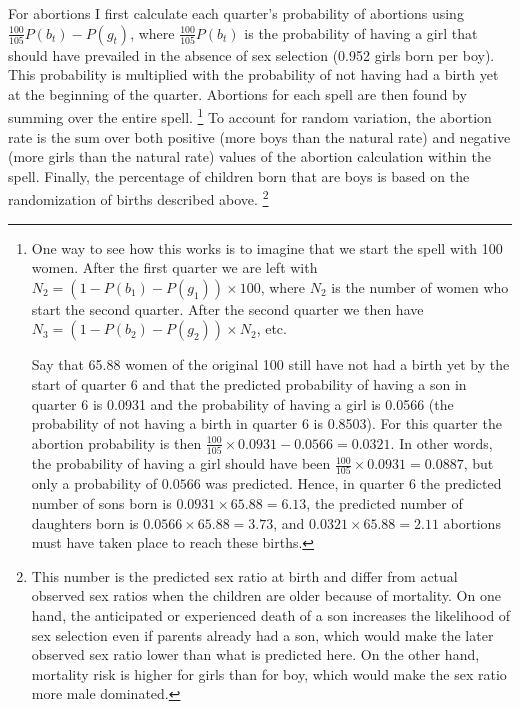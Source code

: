 \documentclass[12pt,letterpaper]{article}
\begin{document}
For abortions I first calculate each quarter's probability of abortions using
$\frac{100}{105}P(b_t)-P(g_t)$,
where $\frac{100}{105}P(b_t)$ is the probability of having a girl that should have 
prevailed in the absence of sex selection (0.952 girls born per boy).
This probability is multiplied with the probability of not having had a birth yet at 
the beginning of the quarter.
Abortions for each spell are then found by summing over the entire spell.%
\footnote{
One way to see how this works is to imagine that we start the spell with 100 women.
After the first quarter we are left with $N_2 = (1-P(b_1)-P(g_1)) \times 100$, where
$N_2$ is the number of women who start the second quarter. 
After the second quarter we then have $N_3 = (1-P(b_2)-P(g_2)) \times N_2$, etc.

Say that 65.88 women of the original 100 still have not had a birth yet by the start
of quarter 6 and that the predicted probability of having a son in quarter 6 is 0.0931 and 
the probability of having a girl is 0.0566 (the probability of not having a birth in 
quarter 6 is 0.8503).
For this quarter the abortion probability is then 
$\frac{100}{105}\times 0.0931 - 0.0566 = 0.0321$.
In other words, the probability of having a girl should have been 
$\frac{100}{105}\times 0.0931 = 0.0887$, but only a probability of $0.0566$ was 
predicted.
Hence, in quarter 6 the predicted number of sons born is $ 0.0931 \times 65.88 = 6.13$, 
the predicted number of daughters born is $ 0.0566 \times 65.88 = 3.73$, and 
$0.0321 \times 65.88 = 2.11$ abortions must have taken place to reach these births.
}
To account for random variation, the abortion rate is the sum over both positive 
(more boys than the natural rate) and negative (more girls than the natural
rate) values of the abortion calculation within the spell.
Finally, the percentage of children born that are boys is based on the randomization of
births described above.%
\footnote{
This number is the predicted sex ratio at birth and differ from actual observed sex 
ratios when the children are older because of mortality.
On one hand, the anticipated or experienced death of a son increases the likelihood
of sex selection even if parents already had a son, which would make the later observed 
sex ratio lower than what is predicted here. 
On the other hand, mortality risk is higher for girls than for boy, which would make
the sex ratio more male dominated.
}


\end{document}
